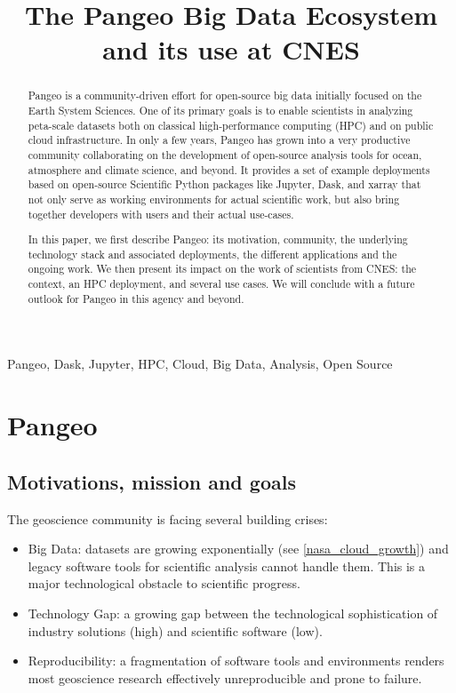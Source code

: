 \documentclass{article}
\title{The Pangeo Big Data Ecosystem and its use at CNES}
\begin{document}
%
\maketitle
%
\begin{abstract}
Pangeo\cite{b1} is a community-driven effort for open-source big data initially
focused on the Earth System Sciences.  One of its primary goals is to enable
scientists in analyzing peta-scale datasets both on classical high-performance
computing (HPC) and on public cloud infrastructure.  In only a few years, Pangeo
has grown into a very productive community collaborating on the development of
open-source analysis tools for ocean, atmosphere and climate science, and
beyond.  It provides a set of example deployments based on open-source
Scientific Python packages like Jupyter\cite{b14}, Dask\cite{b12},
and xarray\cite{b13} that not only serve as working environments for
actual scientific work, but also bring together developers with users and their
actual use-cases.

In this paper, we first describe Pangeo: its motivation, community, the
underlying technology stack and associated deployments, the different
applications and the ongoing work. We then present its impact on the work of
scientists from CNES: the context, an HPC deployment, and several use cases.
We will conclude with a future outlook for Pangeo in this agency and beyond.
\end{abstract}
%
\begin{keywords}
Pangeo, Dask, Jupyter, HPC, Cloud, Big Data, Analysis, Open Source
\end{keywords}
%
\section{Pangeo}
\label{sec:pangeo}

\subsection{Motivations, mission and goals}
\label{ssec:motivations}

The geoscience community is facing several building crises:

\begin{itemize}
\item Big Data: datasets are growing exponentially (see \ref{nasa_cloud_growth}) and legacy software tools for scientific analysis cannot handle them. This is a major technological obstacle to scientific progress.
\item Technology Gap: a growing gap between the technological sophistication of industry solutions (high) and scientific software (low).
\item Reproducibility: a fragmentation of software tools and environments renders most geoscience research effectively unreproducible and prone to failure.
\end{itemize}
\end{document}
